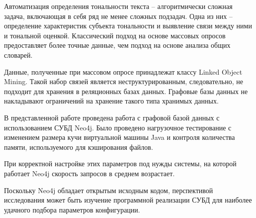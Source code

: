 Автоматизация определения тональности текста -- алгоритмически сложная задача, включающая в себя ряд не менее сложных подзадач. Одна из них -- определение характеристик субъекта тональности и выявление связи между ними и тональной оценкой. Классический подход на основе массовых опросов предоставляет более точные данные, чем подход на основе анализа общих словарей.

Данные, полученные при массовом опросе принадлежат классу Linked Object Mining. Такой набор связей является неструктурированным, следовательно, не подходит для хранения в реляционных базах данных. Графовые базы данных не накладывают ограничений на хранение такого типа хранимых данных. 

В представленной работе проведена работа с графовой базой данных с использованием СУБД Neo4j. Было проведено нагрузочное тестирование с изменением размера кучи виртуальной машины Java и контроля количества памяти, используемого для кэширования файлов. 

При корректной настройке этих параметров под нужды системы, на которой работает Neo4j скорость запросов в среднем возрастает. 

Поскольку Neo4j обладает открытым исходным кодом, перспективой исследования может быть изучение программной реализации СУБД для наиболее удачного подбора параметров конфигурации. 